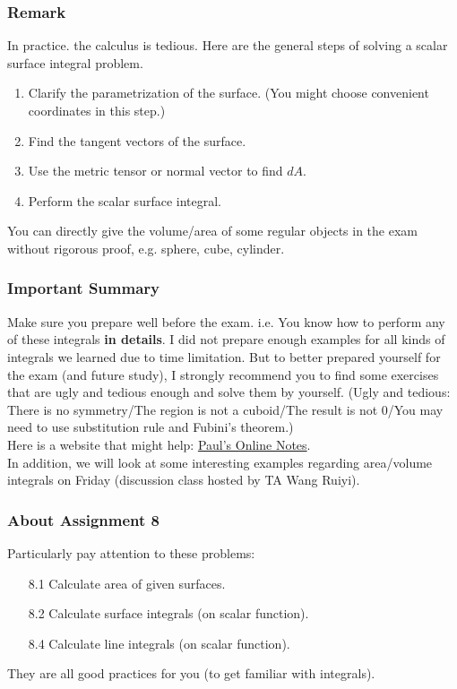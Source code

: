 \documentclass[12pt, t]{beamer}
\newcommand{\nullspace}{~\\[15pt]}
\begin{document}
\begin{frame}
    \frametitle{Remark}
    In practice. the calculus is tedious. Here are the general steps of solving a scalar surface integral problem.

    \begin{enumerate}
        \item Clarify the parametrization of the surface. (You might choose convenient coordinates in this step.)
        \item Find the tangent vectors of the surface.
        \item Use the metric tensor or normal vector to find $dA$.
        \item Perform the scalar surface integral.
    \end{enumerate}

    You can directly give the volume/area of some regular objects in the exam without rigorous proof, e.g. sphere, cube, cylinder.
\end{frame}

\begin{frame}
    \frametitle{Important Summary}
    Make sure you prepare well before the exam. i.e. You know how to perform any of these integrals \textbf{in details}. I did not prepare enough examples for all kinds of integrals we learned due to time limitation. But to better prepared yourself for the exam (and future study), I strongly recommend you to find some exercises that are ugly and tedious enough and solve them by yourself. (Ugly and tedious: There is no symmetry/The region is not a cuboid/The result is not 0/You may need to use substitution rule and Fubini's theorem.)
    \nullspace
    Here is a website that might help: \href{https://tutorial.math.lamar.edu/problems/calciii/SurfaceIntegralsIntro.aspx}{Paul's Online Notes}.
    \nullspace
    In addition, we will look at some interesting examples regarding area/volume integrals on Friday (discussion class hosted by TA Wang Ruiyi).

\end{frame}


\begin{frame}
    \frametitle{About Assignment 8}
    Particularly pay attention to these problems:
    \begin{itemize}
        \item[8.1] Calculate area of given surfaces.
        \item[8.2] Calculate surface integrals (on scalar function).
        \item[8.4] Calculate line integrals (on scalar function).
    \end{itemize}

    They are all good practices for you (to get familiar with integrals).
\end{frame}
\end{document}

